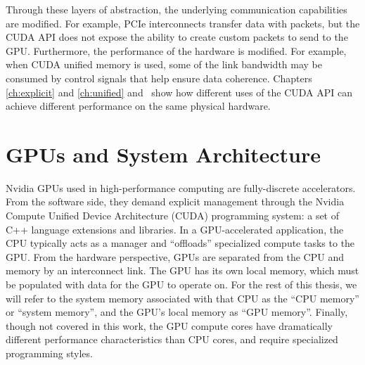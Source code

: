 Through these layers of abstraction, the underlying communication capabilities are modified.
For example, PCIe interconnects transfer data with packets, but the CUDA API does not expose the ability to create custom packets to send to the GPU.
Furthermore, the performance of the hardware is modified.
For example, when CUDA unified memory is used, some of the link bandwidth may be consumed by control signals that help ensure data coherence.
Chapters \ref{ch:explicit} and \ref{ch:unified} and~ show how different uses of the CUDA API can achieve different performance on the same physical hardware.

\section{GPUs and System Architecture}
\label{sec:gpu-sys-arch}

Nvidia GPUs used in high-performance computing are fully-discrete accelerators.
From the software side, they demand explicit management through the Nvidia Compute Unified Device Architecture (CUDA) programming system: a set of C++ language extensions and libraries.
In a GPU-accelerated application, the CPU typically acts as a manager and ``offloads'' specialized compute tasks to the GPU.
From the hardware perspective, GPUs are separated from the CPU and memory by an interconnect link.
The GPU has its own local memory, which must be populated with data for the GPU to operate on.
For the rest of this thesis, we will refer to the system memory associated with that CPU as the ``CPU memory'' or ``system memory'', and the GPU's local memory as ``GPU memory''.
Finally, though not covered in this work, the GPU compute cores have dramatically different performance characteristics than CPU cores, and require specialized programming styles.

